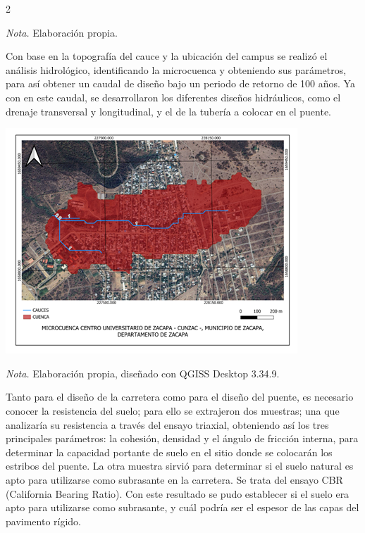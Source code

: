 \documentclass[12pt,spanish,Letterpaper,openany]{book}
\begin{document}
\begin {multicols}{2}
\begin {flushleft}
\begin{minipage}[c]{\columnwidth}
\emph{Nota.} Elaboración propia.

\end{minipage}
\end {flushleft}

Con base en la topografía del cauce y la ubicación del campus se realizó el análisis hidrológico, identificando la microcuenca y obteniendo sus parámetros, para así obtener un caudal de diseño bajo un periodo de retorno de 100 años. Ya con en este caudal, se desarrollaron los diferentes diseños hidráulicos, como el drenaje transversal y longitudinal, y el de la tubería a colocar en el puente.

\begin {flushleft}
\noindent\begin{minipage}[c]{\columnwidth}

\textbf{}

\begin{center}\includegraphics[width=1\linewidth]{imagenes_articulos/art03_02} \end{center}

\emph{Nota.} Elaboración propia, diseñado con QGISS Desktop 3.34.9.

\end{minipage}
\end {flushleft}

Tanto para el diseño de la carretera como para el diseño del puente, es necesario conocer la resistencia del suelo; para ello se extrajeron dos muestras; una que analizaría su resistencia a través del ensayo triaxial, obteniendo así los tres principales parámetros: la cohesión, densidad y el ángulo de fricción interna, para determinar la capacidad portante de suelo en el sitio donde se colocarán los estribos del puente. La otra muestra sirvió para determinar si el suelo natural es apto para utilizarse como subrasante en la carretera. Se trata del ensayo CBR (California Bearing Ratio). Con este resultado se pudo establecer si el suelo era apto para utilizarse como subrasante, y cuál podría ser el espesor de las capas del pavimento rígido.


\end{multicols}
\end{document}
